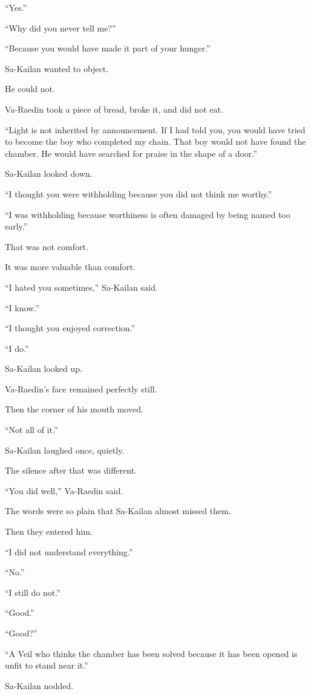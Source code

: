 “Yes.”\par
“Why did you never tell me?”\par
“Because you would have made it part of your hunger.”\par
Sa-Kailan wanted to object.\par
He could not.\par
Va-Raedin took a piece of bread, broke it, and did not eat.\par
“Light is not inherited by announcement. If I had told you, you would have tried to become the boy who completed my chain. That boy would not have found the chamber. He would have searched for praise in the shape of a door.”\par
Sa-Kailan looked down.\par
“I thought you were withholding because you did not think me worthy.”\par
“I was withholding because worthiness is often damaged by being named too early.”\par
That was not comfort.\par
It was more valuable than comfort.\par
“I hated you sometimes,” Sa-Kailan said.\par
“I know.”\par
“I thought you enjoyed correction.”\par
“I do.”\par
Sa-Kailan looked up.\par
Va-Raedin’s face remained perfectly still.\par
Then the corner of his mouth moved.\par
“Not all of it.”\par
Sa-Kailan laughed once, quietly.\par
The silence after that was different.\par
“You did well,” Va-Raedin said.\par
The words were so plain that Sa-Kailan almost missed them.\par
Then they entered him.\par
“I did not understand everything.”\par
“No.”\par
“I still do not.”\par
“Good.”\par
“Good?”\par
“A Veil who thinks the chamber has been solved because it has been opened is unfit to stand near it.”\par
Sa-Kailan nodded.\par
